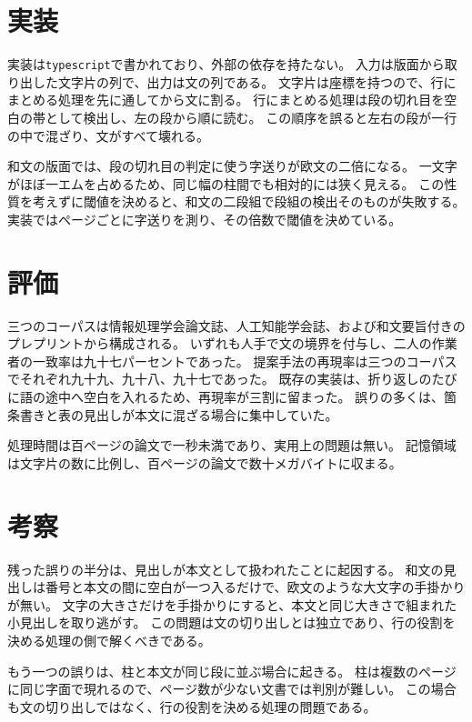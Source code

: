 \documentclass[10pt,a4paper,twocolumn]{article}
\newcommand{\s}[1]{#1}
\begin{document}
\section{実装}

\s{実装は\texttt{typescript}で書かれており、外部の依存を持たない。}%
\s{入力は版面から取り出した文字片の列で、出力は文の列である。}%
\s{文字片は座標を持つので、行にまとめる処理を先に通してから文に割る。}%
\s{行にまとめる処理は段の切れ目を空白の帯として検出し、左の段から順に読む。}%
\s{この順序を誤ると左右の段が一行の中で混ざり、文がすべて壊れる。}%

\s{和文の版面では、段の切れ目の判定に使う字送りが欧文の二倍になる。}%
\s{一文字がほぼ一エムを占めるため、同じ幅の柱間でも相対的には狭く見える。}%
\s{この性質を考えずに閾値を決めると、和文の二段組で段組の検出そのものが失敗する。}%
\s{実装ではページごとに字送りを測り、その倍数で閾値を決めている。}%

\section{評価}

\s{三つのコーパスは情報処理学会論文誌、人工知能学会誌、および和文要旨付きのプレプリントから構成される。}%
\s{いずれも人手で文の境界を付与し、二人の作業者の一致率は九十七パーセントであった。}%
\s{提案手法の再現率は三つのコーパスでそれぞれ九十九、九十八、九十七であった。}%
\s{既存の実装は、折り返しのたびに語の途中へ空白を入れるため、再現率が三割に留まった。}%
\s{誤りの多くは、箇条書きと表の見出しが本文に混ざる場合に集中していた。}%

\s{処理時間は百ページの論文で一秒未満であり、実用上の問題は無い。}%
\s{記憶領域は文字片の数に比例し、百ページの論文で数十メガバイトに収まる。}%

\section{考察}

\s{残った誤りの半分は、見出しが本文として扱われたことに起因する。}%
\s{和文の見出しは番号と本文の間に空白が一つ入るだけで、欧文のような大文字の手掛かりが無い。}%
\s{文字の大きさだけを手掛かりにすると、本文と同じ大きさで組まれた小見出しを取り逃がす。}%
\s{この問題は文の切り出しとは独立であり、行の役割を決める処理の側で解くべきである。}%

\s{もう一つの誤りは、柱と本文が同じ段に並ぶ場合に起きる。}%
\s{柱は複数のページに同じ字面で現れるので、ページ数が少ない文書では判別が難しい。}%
\s{この場合も文の切り出しではなく、行の役割を決める処理の問題である。}%
\end{document}
